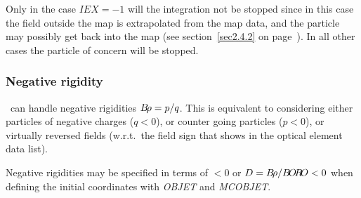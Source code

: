 \noindent Only in the case $IEX=-1$ will the integration not be stopped since in this case 
the field outside the map is extrapolated from the map data, and the particle may possibly get 
back into the map (see section~\ref{sec2.4.2} on page~\pageref{sec2.4.2}).  In all other cases 
  the particle of concern will be stopped. 

\subsubsection{Negative rigidity} \label{sec4.6.7}   

\zgou\ can handle negative rigidities $B\!\rho = p/q$. This is equivalent to 
considering either particles of negative charges ($q<0$), or counter 
going particles ($p<0$), or virtually reversed fields (w.r.t.~the field sign 
that shows in the optical element data list).

\noindent Negative rigidities may be specified in terms of 
\BORO $<0$ or $D=B\!\rho / B\!O\!R\!O < 0$ when 
defining the initial coordinates with \textsl{OBJET} and 
\textsl{MCOBJET}.
